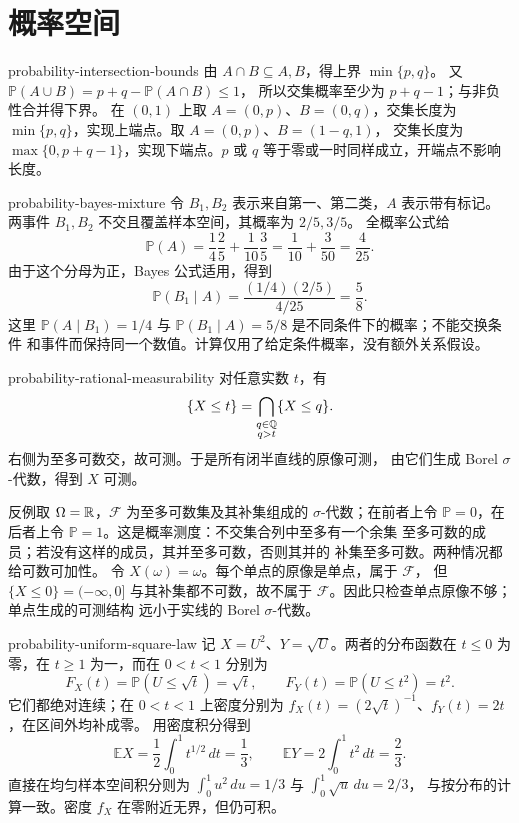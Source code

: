 \chapter{概率空间}

\begin{solution}{probability-intersection-bounds}
由 \(A\cap B\subseteq A,B\)，得上界 \(\min\{p,q\}\)。
又 \(\mathbb P(A\cup B)=p+q-\mathbb P(A\cap B)\le1\)，
所以交集概率至少为 \(p+q-1\)；与非负性合并得下界。
在 \((0,1)\) 上取 \(A=(0,p)\)、\(B=(0,q)\)，交集长度为
\(\min\{p,q\}\)，实现上端点。取 \(A=(0,p)\)、\(B=(1-q,1)\)，
交集长度为 \(\max\{0,p+q-1\}\)，实现下端点。\(p\) 或 \(q\)
等于零或一时同样成立，开端点不影响长度。
\end{solution}

\begin{solution}{probability-bayes-mixture}
令 \(B_1,B_2\) 表示来自第一、第二类，\(A\) 表示带有标记。
两事件 \(B_1,B_2\) 不交且覆盖样本空间，其概率为 \(2/5,3/5\)。
全概率公式给
\[
 \mathbb P(A)=\frac14\frac25+\frac1{10}\frac35
 =\frac1{10}+\frac3{50}=\frac4{25}.
\]
由于这个分母为正，Bayes 公式适用，得到
\[
 \mathbb P(B_1\mid A)
 =\frac{(1/4)(2/5)}{4/25}=\frac58.
\]
这里 \(\mathbb P(A\mid B_1)=1/4\) 与
\(\mathbb P(B_1\mid A)=5/8\) 是不同条件下的概率；不能交换条件
和事件而保持同一个数值。计算仅用了给定条件概率，没有额外关系假设。
\end{solution}

\begin{solution}{probability-rational-measurability}
对任意实数 \(t\)，有
\[
 \{X\le t\}=\bigcap_{\substack{q\in\mathbb{Q}\\q>t}}\{X\le q\}.
\]
右侧为至多可数交，故可测。于是所有闭半直线的原像可测，
由它们生成 Borel \(\sigma\)-代数，得到 \(X\) 可测。

反例取 \(\Omega=\mathbb{R}\)，\(\mathcal F\) 为至多可数集及其补集组成的
\(\sigma\)-代数；在前者上令 \(\mathbb P=0\)，在后者上令
\(\mathbb P=1\)。这是概率测度：不交集合列中至多有一个余集
至多可数的成员；若没有这样的成员，其并至多可数，否则其并的
补集至多可数。两种情况都给可数可加性。
令 \(X(\omega)=\omega\)。每个单点的原像是单点，属于 \(\mathcal F\)，
但 \(\{X\le0\}=({-\infty},0]\) 与其补集都不可数，故不属于
\(\mathcal F\)。因此只检查单点原像不够；单点生成的可测结构
远小于实线的 Borel \(\sigma\)-代数。
\end{solution}

\begin{solution}{probability-uniform-square-law}
记 \(X=U^2\)、\(Y=\sqrt U\)。两者的分布函数在 \(t\le0\)
为零，在 \(t\ge1\) 为一，而在 \(0<t<1\) 分别为
\[
 F_X(t)=\mathbb P(U\le\sqrt t)=\sqrt t,
 \qquad F_Y(t)=\mathbb P(U\le t^2)=t^2.
\]
它们都绝对连续；在 \(0<t<1\) 上密度分别为
\(f_X(t)=(2\sqrt t)^{-1}\)、\(f_Y(t)=2t\)，在区间外均补成零。
用密度积分得到
\[
 \mathbb E X=\frac12\int_0^1t^{1/2}\,dt=\frac13,
 \qquad \mathbb E Y=2\int_0^1t^2\,dt=\frac23.
\]
直接在均匀样本空间积分则为
\(\int_0^1u^2\,du=1/3\) 与 \(\int_0^1\sqrt u\,du=2/3\)，
与按分布的计算一致。密度 \(f_X\) 在零附近无界，但仍可积。
\end{solution}

